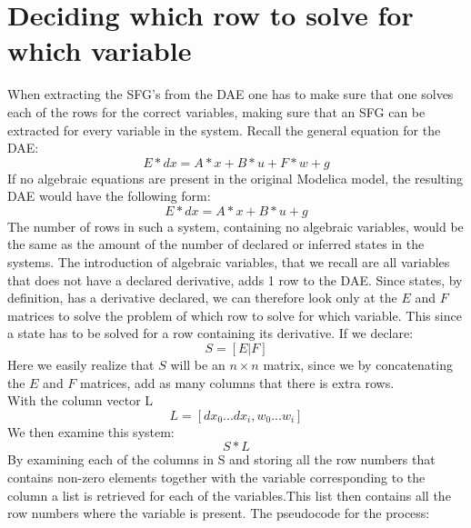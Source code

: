 
\section{Deciding which row to solve for which variable}
When extracting the SFG's from the DAE one has to make sure that one solves each of the rows for the correct variables, making sure that an SFG can be extracted for every variable in the system. Recall the general equation for the DAE:
\begin{equation}
E*dx = A*x + B*u + F*w + g
\end{equation}
If no algebraic equations are present in the original Modelica model, the resulting DAE would have the following form:
\begin{equation}
E*dx = A*x + B*u + g
\end{equation}
The number of rows in such a system, containing no algebraic variables, would be the same as the amount of the number of declared or inferred states in the systems. The introduction of algebraic variables, that we recall are all variables that does not have a declared derivative, adds 1 row to the DAE. Since states, by definition, has a derivative declared, we can therefore look only at the $E$ and $F$ matrices to solve the problem of which row to solve for which variable. This since a state has to be solved for a row containing its derivative. If we declare:
\begin{equation}
S=[E|F]
\end{equation}
Here we easily realize that $S$ will be an $n \times n$ matrix, since we by concatenating the $E$ and $F$ matrices, add as many columns that there is extra rows.\\
With the column vector L
\begin{equation}
L=[dx_0...dx_i, w_0...w_i]
\end{equation}
We then examine this system:
\begin{equation}
S*L
\end{equation}
By examining each of the columns in S and storing all the row numbers that contains non-zero elements together with the variable corresponding to the column a list is retrieved for each of the variables.This  list then contains all the row numbers where the variable is present.
The pseudocode for the process:

